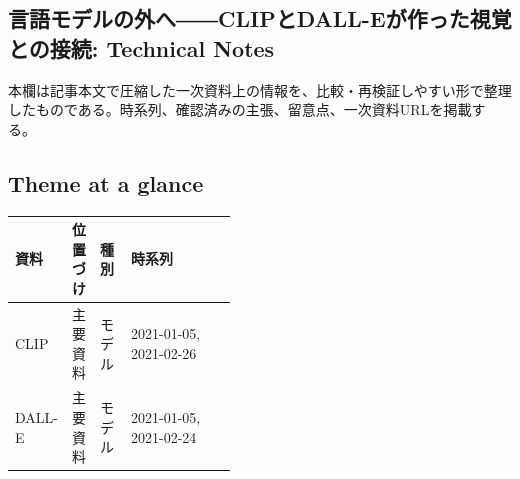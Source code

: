 \subsection*{言語モデルの外へ――CLIPとDALL-Eが作った視覚との接続: Technical Notes}
本欄は記事本文で圧縮した一次資料上の情報を、比較・再検証しやすい形で整理したものである。時系列、確認済みの主張、留意点、一次資料URLを掲載する。
\smallskip
{}\par
\medskip
\subsection*{Theme at a glance}
\begin{center}
\footnotesize
\begin{tabularx}{\linewidth}{@{}p{0.20\linewidth}p{0.10\linewidth}p{0.14\linewidth}X@{}}
\toprule
資料 & 位置づけ & 種別 & 時系列 \\
\midrule
CLIP & 主要資料 & モデル & 2021-01-05, 2021-02-26 \\
DALL-E & 主要資料 & モデル & 2021-01-05, 2021-02-24 \\
\bottomrule
\end{tabularx}
\end{center}
\normalsize

